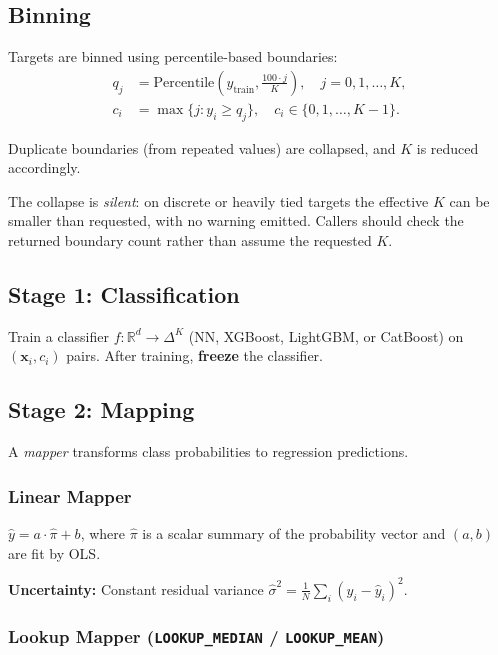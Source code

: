 \documentclass[11pt,a4paper]{article}
\theoremstyle{definition}
\newcommand{\R}{\mathbb{R}}
\newcommand{\bx}{\mathbf{x}}
\begin{document}
\subsection{Binning}

Targets are binned using percentile-based boundaries:
\begin{align}
  q_j &= \text{Percentile}\left(y_{\mathrm{train}}, \frac{100 \cdot j}{K}\right), \quad j = 0, 1, \ldots, K, \\
  c_i &= \max\{j : y_i \geq q_j\}, \quad c_i \in \{0, 1, \ldots, K-1\}.
\end{align}

Duplicate boundaries (from repeated values) are collapsed, and $K$ is
reduced accordingly.

\begin{implnote}
The collapse is \emph{silent}: on discrete or heavily tied targets the effective $K$ can be
smaller than requested, with no warning emitted. Callers should check the returned boundary
count rather than assume the requested $K$.
\end{implnote}

\subsection{Stage 1: Classification}

Train a classifier $f: \R^d \to \Delta^K$ (NN, XGBoost, LightGBM, or
CatBoost) on $(\bx_i, c_i)$ pairs. After training, \textbf{freeze} the classifier.

\subsection{Stage 2: Mapping}

A \emph{mapper} transforms class probabilities to regression predictions.

\subsubsection{Linear Mapper}

$\hat{y} = a \cdot \hat{\pi} + b$, where $\hat{\pi}$ is a scalar summary
of the probability vector and $(a, b)$ are fit by OLS.

\textbf{Uncertainty:} Constant residual variance $\hat{\sigma}^2 = \frac{1}{N}\sum_i(y_i - \hat{y}_i)^2$.

\subsubsection{Lookup Mapper (\texttt{LOOKUP\_MEDIAN} / \texttt{LOOKUP\_MEAN})}
\end{document}
